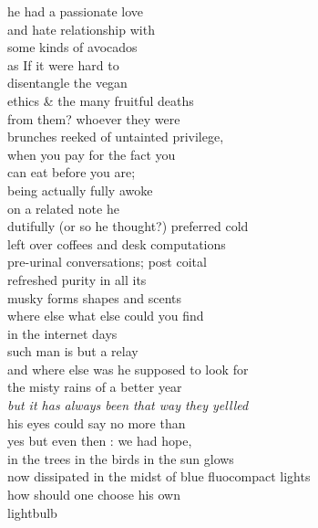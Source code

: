 he had a passionate love \\
and hate relationship with\\
some kinds of avocados\\
as If it were hard to\\
disentangle the vegan\\
ethics \& the many fruitful deaths\\
from them? whoever they were\\
brunches reeked of untainted privilege,\\
when you pay for the fact you\\
can eat before you are;\\
being actually fully awoke\\

on a related note he\\
dutifully (or so he thought?) preferred cold\\
left over coffees and desk computations\\
pre-urinal conversations; post coital\\
refreshed purity in all its\\
musky forms shapes and scents\\
where else what else could you find\\
in the internet days\\
such man is but a relay\\
and where else was he supposed to look for\\
the misty rains of a better year\\


\textit{but it has always been that way they yellled} \\
his eyes could say no more than\\
yes but even then : we had hope,\\
in the trees in the birds in the sun glows\\
now dissipated in the midst of blue fluocompact lights\\
how should one choose his own\\
lightbulb\\
